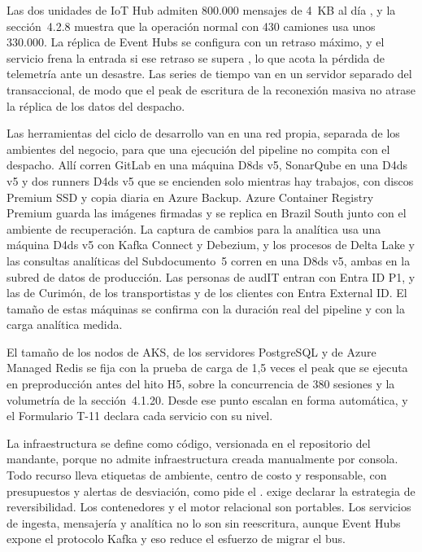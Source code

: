 Las dos unidades de IoT Hub admiten 800.000 mensajes de 4~KB al día \parencite{ms_iothub_cuotas}, y la
sección~4.2.8 muestra que la operación normal con 430 camiones usa unos 330.000. La réplica de Event
Hubs se configura con un retraso máximo, y el servicio frena la entrada si ese retraso se supera
\parencite{ms_eh_georep}, lo que acota la pérdida de telemetría ante un desastre. Las series de tiempo
van en un servidor separado del transaccional, de modo que el peak de escritura de la reconexión masiva
no atrase la réplica de los datos del despacho.

Las herramientas del ciclo de desarrollo van en una red propia, separada de los ambientes del negocio,
para que una ejecución del pipeline no compita con el despacho. Allí corren GitLab en una máquina D8ds
v5, SonarQube en una D4ds v5 y dos runners D4ds v5 que se encienden solo mientras hay trabajos, con
discos Premium SSD y copia diaria en Azure Backup. Azure Container Registry Premium guarda las imágenes
firmadas y se replica en Brazil South junto con el ambiente de recuperación. La captura de cambios para
la analítica usa una máquina D4ds v5 con Kafka Connect y Debezium, y los procesos de Delta Lake y las
consultas analíticas del Subdocumento~5 corren en una D8ds v5, ambas en la subred de datos de
producción. Las personas de audIT entran con Entra ID P1, y las de Curimón, de los transportistas y de
los clientes con Entra External ID. El tamaño de estas máquinas se confirma con la duración real del
pipeline y con la carga analítica medida.

El tamaño de los nodos de AKS, de los servidores PostgreSQL y de Azure Managed Redis se fija con la
prueba de carga de 1,5 veces el peak que se ejecuta en preproducción  antes del
hito H5, sobre la concurrencia de 380 sesiones y la volumetría de la sección~4.1.20. Desde ese punto
escalan en forma automática, y el Formulario T-11 declara cada servicio con su nivel.

La infraestructura se define como código, versionada en el repositorio del mandante, porque
 no admite infraestructura creada manualmente por consola. Todo recurso lleva
etiquetas de ambiente, centro de costo y responsable, con presupuestos y alertas de desviación, como
pide el .  exige declarar la estrategia de reversibilidad. Los
contenedores y el motor relacional son portables. Los servicios de ingesta, mensajería y analítica no lo
son sin reescritura, aunque Event Hubs expone el protocolo Kafka y eso reduce el esfuerzo de migrar el
bus.


